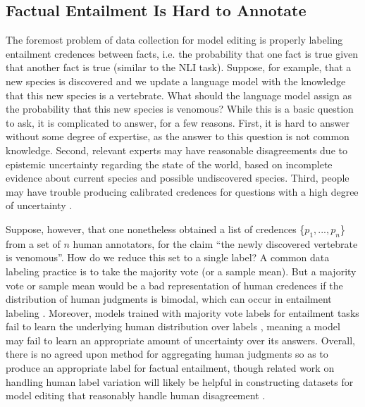 \documentclass[11pt,a4paper]{article}
\begin{document}
\subsection{Factual Entailment Is Hard to Annotate}
\label{sec:factual_entailment_is_hard_to_annotate}

The foremost problem of data collection for model editing is properly labeling entailment credences between facts, i.e. the probability that one fact is true given that another fact is true (similar to the NLI task).
Suppose, for example, that a new species is discovered and we update a language model with the knowledge that this new species is a vertebrate. What should the language model assign as the probability that this new species is venomous?
While this is a basic question to ask, it is complicated to answer, for a few reasons. First, it is hard to answer without some degree of expertise, as the answer to this question is not common knowledge. 
Second, relevant experts may have reasonable disagreements due to epistemic uncertainty regarding the state of the world, based on incomplete evidence about current species and possible undiscovered species. 
Third, people may have trouble producing calibrated credences for questions with a high degree of uncertainty \citep{tversky1974judgment}. 

Suppose, however, that one nonetheless obtained a list of credences \{$p_1,...,p_n$\} from a set of $n$ human annotators, for the claim ``the newly discovered vertebrate is venomous''. How do we reduce this set to a single label? A common data labeling practice is to take the majority vote (or a sample mean). But a majority vote or sample mean would be a bad representation of human credences if the distribution of human judgments is bimodal, which can occur in entailment labeling \citep{pavlick2019inherent}. 
Moreover, models trained with majority vote labels for entailment tasks fail to learn the underlying human distribution over labels \citep{nie2020can}, meaning a model may fail to learn an appropriate amount of uncertainty over its answers. 
Overall, there is no agreed upon method for aggregating human judgments so as to produce an appropriate label for factual entailment, though related work on handling human label variation will likely be helpful in constructing datasets for model editing that reasonably handle human disagreement \citep{uma2021learning, zhou2021distributed, plank2022problem, liu2023we}. 
\end{document}
